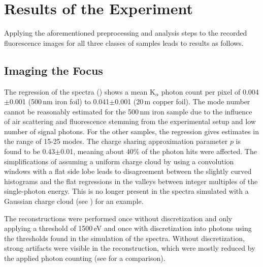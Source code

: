 \section{Results of the Experiment}
Applying the aforementioned preprocessing and analysis steps to the recorded fluorescence images for all three classes of samples leads to results as follows. 
\subsection{Imaging the Focus}

The regression of the spectra () shows a mean K$_{\alpha}$ photon count per pixel of 0.004$\pm$0.001 (500\,nm iron foil) to 0.041$\pm$0.001 (20\,\textmu m copper foil). The mode number cannot be reasonably estimated for the 500\,nm iron sample due to the influence of air scattering and fluorescence stemming from the experimental setup and low number of signal photons. For the other samples, the regression gives estimates in the range of 15-25 modes. The charge sharing approximation parameter $p$ is found to be 0.43$\pm$0.01, meaning about 40\% of the photon hits were affected. The simplifications of assuming a uniform charge cloud by using a convolution windows with a flat side lobe leads to disagreement between the slightly curved histograms and the flat regressions in the valleys between integer multiples of the single-photon energy. This is no longer present in the spectra simulated with a Gaussian charge cloud (see ) for an example.

The reconstructions were performed once without discretization and only applying a threshold of 1500\,eV and once with discretization into photons using the thresholds found in the simulation of the spectra. Without discretization, strong artifacts were visible in the reconstruction, which were mostly reduced by the applied photon counting (see  for a comparison).

